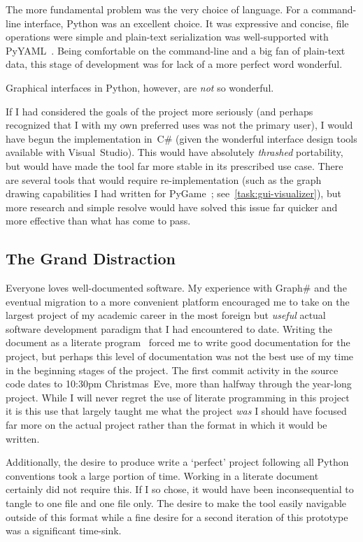 The more fundamental problem was the very choice of language.
For a command-line interface, Python was an excellent choice.
It was expressive and concise, file operations were simple and
  plain-text serialization was well-supported with PyYAML~\autocite{pyyaml}.
Being comfortable on the command-line and a big fan of plain-text data,
  this stage of development was \Dash for lack of a more perfect word \Dash wonderful.

Graphical interfaces in Python, however, are \emph{not} so wonderful.

If I had considered the goals of the project more seriously
  (and perhaps recognized that I \Dash with my own preferred uses \Dash was not the primary user),
  I would have begun the implementation in~C\#
  (given the wonderful interface design tools available with Visual~Studio).
This would have absolutely \emph{thrashed} portability,
  but would have made the tool far more stable in its prescribed use case.
There are several tools that would require re-implementation
  (such as the graph drawing capabilities I had written
  for PyGame~\autocite{pygame}; see~\autoref{task:gui-visualizer}),
  but more research and simple resolve would have solved this issue
  far quicker and more effective than what has come to pass.

\subsection{The Grand Distraction}
Everyone loves well-documented software.
My experience with Graph\# \Dash and the eventual migration to a more convenient platform \Dash
  encouraged me to take on the largest project of my academic career in
  the most foreign \Dash but \emph{useful} \Dash actual software development paradigm
  that I had encountered to date.
Writing the document as a literate program~\autocite{knuth:lit-prog}
  forced me to write good documentation for the project,
  but perhaps this level of documentation was not the best use of my time
  in the beginning stages of the project.
The first commit activity in the source code dates to 10:30pm Christmas~Eve,
  more than halfway through the year-long project.
While I will never regret the use of literate programming in this project \Dash
  it is this use that largely taught me what the project \emph{was} \Dash
  I should have focused far more on the actual project
  rather than the format in which it would be written.

Additionally, the desire to produce write a \enquote*{perfect} project \Dash
  following all Python conventions \Dash
  took a large portion of time.
Working in a literate document certainly did not require this.
If I so chose, it would have been inconsequential to tangle to
  one file and one file only.
The desire to make the tool easily navigable outside of this format \Dash
  while a fine desire for a second iteration of this prototype \Dash
  was a significant time-sink.

